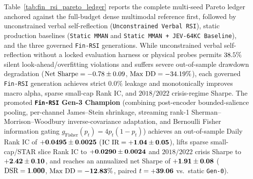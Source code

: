 Table~\ref{tab:fin_rsi_pareto_ledger} reports the complete multi-seed Pareto ledger anchored
against the full-budget dense multimodal reference first, followed by unconstrained verbal
self-reflection (\texttt{Unconstrained Verbal RSI}), static production baselines (\texttt{Static MMAN}
and \texttt{Static MMAN + JEV-64KC Baseline}), and the three governed \texttt{Fin-RSI} generations.
While unconstrained verbal self-reflection without a locked evaluation harness or physical probes
permits $38.5{}\%$ silent look-ahead/overfitting violations and suffers severe
out-of-sample drawdown degradation ($\text{Net Sharpe} = -0.78{} \pm 0.09{}$,
$\text{Max DD} = -34.19{}\%$), each governed \texttt{Fin-RSI} generation achieves
strict $0.0\%$ leakage and monotonically improves macro alpha, sparse small-cap Rank IC, and
$2018/2022$ crisis-regime Sharpe. The promoted \textbf{\texttt{Fin-RSI} Gen-3 Champion}
(combining post-encoder bounded-salience pooling, per-channel James--Stein shrinkage, streaming
rank-1 Sherman--Morrison--Woodbury inverse-covariance adaptation, and Bernoulli Fisher information
gating $g_{\text{Fisher}}(p_t) = 4p_t(1-p_t)$) achieves an out-of-sample Daily Rank IC of
$\mathbf{+0.0495{} \pm 0.0025{}}$ ($\text{IC IR} = \mathbf{+1.04{} \pm 0.05{}}$),
lifts sparse small-cap/STAR slice Rank IC to $\mathbf{+0.0290{} \pm 0.0024{}}$
and $2018/2022$ crisis Sharpe to $\mathbf{+2.42{} \pm 0.10{}}$,
and reaches an annualized net Sharpe of $\mathbf{+1.91{} \pm 0.08{}}$
($\text{DSR} = \mathbf{1.000{}}$, $\text{Max DD} = \mathbf{-12.83{}\%}$,
paired $t = \mathbf{+39.06{}}$ vs.\ static \texttt{Gen-0}).

